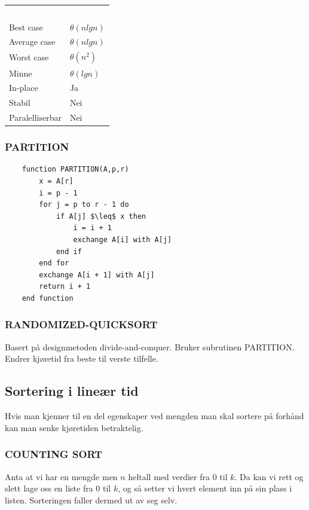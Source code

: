 \begin{table}[H]
    \label{tab:bubblesort}
    \centering
    \begin{tabular}{|L{15em} | L{15em}|}
        \hline
        \textbf{\textcolor{white}{Tilfelle}} & \textbf{\textcolor{white}{}}\\
        Best case & $\theta(n lg n)$\\
        Average case & $\theta(n lg n)$\\
        Worst case & $\theta(n^2)$\\
        Minne & $\theta(lg n)$\\
        In-place & Ja\\
        Stabil & Nei\\
        Paralelliserbar & Nei\\
         \hline
    \end{tabular}
\end{table}

\subsubsection{PARTITION}

\begin{lstlisting}
    function PARTITION(A,p,r)
	    x = A[r]
    	i = p - 1
    	for j = p to r - 1 do
    		if A[j] $\leq$ x then
    			i = i + 1
    			exchange A[i] with A[j]
    		end if
    	end for
    	exchange A[i + 1] with A[j]
    	return i + 1
    end function
\end{lstlisting}

\subsubsection{RANDOMIZED-QUICKSORT}
Basert på designmetoden divide-and-conquer. Bruker subrutinen PARTITION. Endrer kjøretid fra beste til verste tilfelle.

\subsection{Sortering i lineær tid}
Hvis man kjenner til en del egenskaper ved mengden man skal sortere på forhånd kan man senke kjøretiden betraktelig.

\subsubsection{COUNTING SORT}
Anta at vi har en mengde men $n$ heltall med verdier fra 0 til $k$. Da kan vi rett og slett lage oss en liste fra 0 til $k$, og så setter vi hvert element inn på sin plass i listen. Sorteringen faller dermed ut av seg selv.

